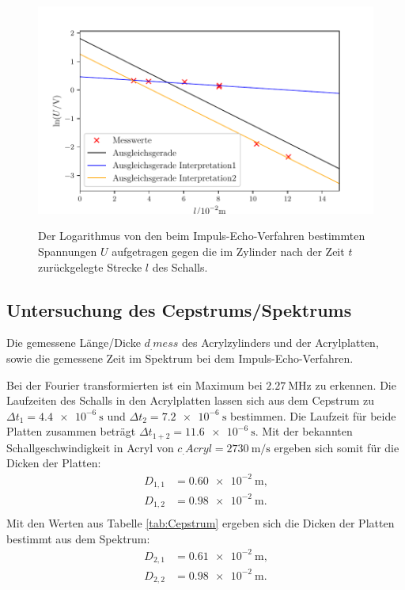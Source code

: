 \begin{figure}
	\centering
	\caption{Der Logarithmus von den beim Impuls-Echo-Verfahren bestimmten Spannungen $U$ aufgetragen gegen die im Zylinder nach der Zeit $t$ zurückgelegte Strecke $l$ des Schalls.}
	\includegraphics[width=\linewidth-70pt,height=\textheight-70pt,keepaspectratio]{content/images/Daempfung.pdf}
	\label{fig:Daempfung}
\end{figure}

\subsection{Untersuchung des Cepstrums/Spektrums}

\begin{table}
	\centering
	\caption{Die gemessene Länge/Dicke $d_.{mess}$ des Acrylzylinders und der Acrylplatten, sowie die gemessene Zeit im Spektrum bei dem Impuls-Echo-Verfahren.}
	
	\label{tab:Cepstrum}
\end{table}

\noindent Bei der Fourier transformierten ist ein Maximum bei $\SI{2.27}{\mega\hertz}$ zu erkennen.
Die Laufzeiten des Schalls in den Acrylplatten lassen sich aus dem Cepstrum zu $\Delta t_1=\SI{4.4e-6}{\second}$ und $\Delta t_2=\SI{7.2e-6}{\second}$ bestimmen. Die Laufzeit für beide Platten zusammen beträgt $\Delta t_{1+2}=\SI{11.6e-6}{\second}$. 
Mit der bekannten Schallgeschwindigkeit in Acryl von $c_.{Acryl}=\SI{2730}{\meter\per\second}$ \cite{cAcryl} ergeben sich somit für die Dicken der Platten:
\begin{align*}
D_{1,1}&=\SI{0.60e-2}{\meter}\text{,}\\
D_{1,2}&=\SI{0.98e-2}{\meter}\text{.}\\
\end{align*}
Mit den Werten aus Tabelle \ref{tab:Cepstrum} ergeben sich die Dicken der Platten bestimmt aus dem Spektrum:
\begin{align*}
D_{2,1}&=\SI{0.61e-2}{\meter}\text{,}\\
D_{2,2}&=\SI{0.98e-2}{\meter}\text{.}\\
\end{align*}


